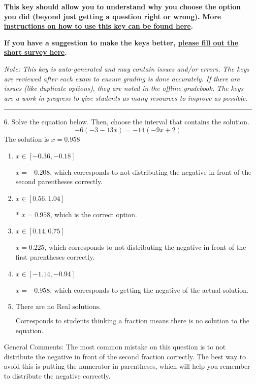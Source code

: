 \documentclass{extbook}[14pt]
\begin{document}
\textbf{This key should allow you to understand why you choose the option you did (beyond just getting a question right or wrong). \href{https://xronos.clas.ufl.edu/mac1105spring2020/courseDescriptionAndMisc/Exams/LearningFromResults}{More instructions on how to use this key can be found here}.}

\textbf{If you have a suggestion to make the keys better, \href{https://forms.gle/CZkbZmPbC9XALEE88}{please fill out the short survey here}.}

\textit{Note: This key is auto-generated and may contain issues and/or errors. The keys are reviewed after each exam to ensure grading is done accurately. If there are issues (like duplicate options), they are noted in the offline gradebook. The keys are a work-in-progress to give students as many resources to improve as possible.}

\rule{\textwidth}{0.4pt}

6. Solve the equation below. Then, choose the interval that contains the solution.
\[ -6(-3-13 x) = -14(-9 x+2) \] 
The solution is $ x = 0.958 $ 

\begin{enumerate}[label=\Alph*.] 
\item $ x \in [-0.36, -0.18] $ 

  $x = -0.208$, which corresponds to not distributing the negative in front of the second parentheses correctly. 
\item $ x \in [0.56, 1.04] $ 

 * $x = 0.958$, which is the correct option. 
\item $ x \in [0.14, 0.75] $ 

  $x = 0.225$, which corresponds to not distributing the negative in front of the first parentheses correctly. 
\item $ x \in [-1.14, -0.94] $ 

  $x = -0.958$, which corresponds to getting the negative of the actual solution. 
\item $ \text{There are no Real solutions. } $ 

 Corresponds to students thinking a fraction means there is no solution to the equation. 
\end{enumerate} 
 
General Comments: The most common mistake on this question is to not distribute the negative in front of the second fraction correctly. The best way to avoid this is putting the numerator in parentheses, which will help you remember to distribute the negative correctly.
\end{document}
